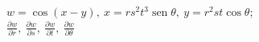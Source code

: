 \item $w = \cos(x - y), \ x = rs^2t^3 \operatorname{sen} \theta, \ y = r^2st \cos \theta$; \\
$\frac{\partial w}{\partial r}, \ \frac{\partial w}{\partial s}, \ \frac{\partial w}{\partial t}, \ \frac{\partial w}{\partial \theta}$
